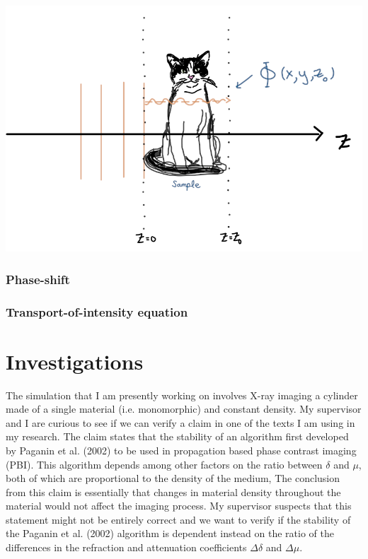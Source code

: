 \documentclass[9pt, a4paper]{article}
\newenvironment{Figure}
    {\par\medskip\noindent\minipage{\linewidth}}
    {\endminipage\par\medskip}
\begin{document}
\begin{Figure}
\centering
\includegraphics[width=0.6\linewidth]{projection_approximation.png}
\end{Figure}

\subsubsection{Phase-shift}

\subsubsection{Transport-of-intensity equation}


\section{Investigations}
The simulation that I am presently working on involves X-ray imaging a cylinder made of a single material (i.e. monomorphic) and constant density. My supervisor and I are curious to see if we can verify a claim in one of the texts I am using in my research. The claim states that the stability of an algorithm first developed by Paganin et al. (2002)\cite{Pags2002}\cite{CH49} to be used in propagation based phase contrast imaging (PBI). This algorithm depends among other factors on the ratio between $\delta$ and $\mu$, both of which are proportional to the density of the medium, The conclusion from this claim is essentially that changes in material density throughout the material would not affect the imaging process. My supervisor suspects that this statement might not be entirely correct and we want to verify if the stability of the Paganin et al. (2002) algorithm is dependent instead on the ratio of the differences in the refraction and attenuation coefficients $\Delta \delta$ and $\Delta \mu$.
\end{document}
